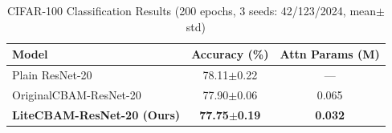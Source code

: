 \begin{table}[ht]
\centering
\caption{CIFAR-100 Classification Results (200 epochs, 3 seeds: 42/123/2024, mean$\pm$std)}
\label{tab:cifar100_multiseed}
\begin{tabular}{lcc}
\toprule
\textbf{Model} & \textbf{Accuracy (\%)} & \textbf{Attn Params (M)} \\
\midrule
Plain ResNet-20 & 78.11$\pm$0.22 & — \\
OriginalCBAM-ResNet-20 & 77.90$\pm$0.06 & 0.065 \\
\textbf{LiteCBAM-ResNet-20 (Ours)} & \textbf{77.75$\pm$0.19} & \textbf{0.032} \\
\bottomrule
\end{tabular}
\end{table}
